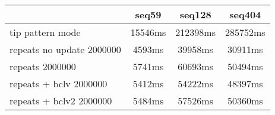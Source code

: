\begin{tabular}{|l|c|c|c|}
\hline
 & seq59 & seq128 & seq404  \\
\hline
tip pattern mode &  15546ms &  212398ms &  285752ms\\
\hline
repeats no update 2000000 &  4593ms &  39958ms &  30911ms\\
\hline
repeats 2000000 &  5741ms &  60693ms &  50494ms\\
\hline
repeats + bclv 2000000 &  5412ms &  54222ms &  48397ms\\
\hline
repeats + bclv2 2000000 &  5484ms &  57526ms &  50360ms\\
\hline
\end{tabular}
